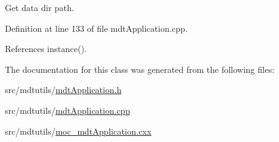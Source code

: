 Get data dir path. 



Definition at line 133 of file mdt\-Application.\-cpp.



References instance().



The documentation for this class was generated from the following files\-:\begin{DoxyCompactItemize}
\item 
src/mdtutils/\hyperlink{mdt_application_8h}{mdt\-Application.\-h}\item 
src/mdtutils/\hyperlink{mdt_application_8cpp}{mdt\-Application.\-cpp}\item 
src/mdtutils/\hyperlink{moc__mdt_application_8cxx}{moc\-\_\-mdt\-Application.\-cxx}\end{DoxyCompactItemize}
